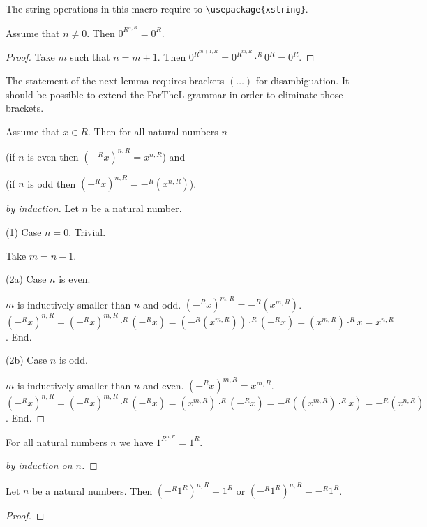 \documentclass[11pt]{article}
\begin{document}
\noindent The string operations in this macro require to 
\verb|\usepackage{xstring}|.

\begin{forthel}
\begin{lemma} Assume that $n \neq 0$. Then $0^{R}^{n,R} = 0^{R}$. \end{lemma}
\begin{proof}
Take $m$ such that
$n = m + 1$. Then $0^{R}^{m+1,R} = 0^{R}^{m,R} \cdot^{R} 0^{R}
= 0^{R}$.
\end{proof}
\end{forthel}
%
The statement of the next lemma requires brackets $(\dots)$ for
disambiguation. It should be possible to extend the ForTheL grammar in
order to eliminate those brackets.
%
\begin{forthel}
\begin{lemma}
Assume that $x \in R$. Then for all natural numbers $n$

(if $n$ is even then $(-^{R}x)^{n,R} = x^{n,R}$)
and 

(if $n$ is odd then $(-^{R}x)^{n,R} = -^{R}(x^{n,R})$).
\end{lemma}
\begin{proof}[by induction]
Let $n$ be a natural number.

(1) Case $n = 0$. Trivial.

Take $m = n - 1$.

(2a) Case $n$ is even. 

$m$ is inductively smaller than $n$ and odd.
$(-^{R}x)^{m,R} = -^{R}(x^{m,R})$.
$(-^{R}x)^{n,R} = (-^{R}x)^{m,R} \cdot^{R} (-^{R}x) = (-^{R}(x^{m,R})) \cdot^{R} (-^{R}x)
= (x^{m,R}) \cdot^{R} x = x^{n,R}$.
End.

(2b) Case $n$ is odd. 

$m$ is inductively smaller than $n$ and even.
$(-^{R}x)^{m,R} = x^{m,R}$.
$(-^{R}x)^{n,R} = (-^{R}x)^{m,R} \cdot^{R} (-^{R}x) = (x^{m,R}) \cdot^{R} (-^{R}x)
= -^{R} ((x^{m,R}) \cdot^{R} x) = -^{R}(x^{n,R})$.
End.

\end{proof}

\begin{lemma} For all natural numbers $n$ we have $1^{R}^{n,R} = 1^{R}$. \end{lemma}
\begin{proof}[by induction on $n$]
\end{proof}

\begin{lemma} Let $n$ be a natural numbers. Then $(-^{R} 1^{R})^{n,R} = 1^{R}$
or $(-^{R} 1^{R})^{n,R} = -^{R} 1^{R}$. 
\end{lemma}
\begin{proof}
\end{proof}


\end{forthel}
\end{document}
